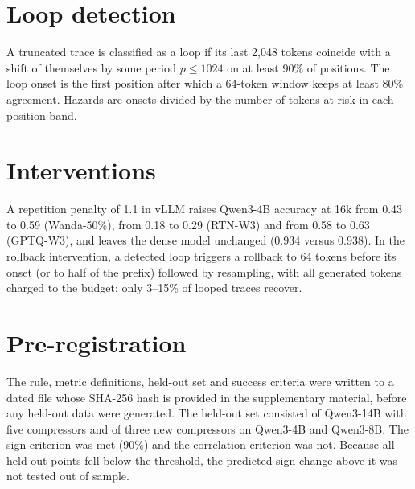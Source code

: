 \documentclass[10pt]{article}
\begin{document}
\begin{table}[t]
  \centering\small
  \caption{Accuracy at 16k tokens by sampling temperature (Qwen3-4B, MATH-500).}
  \label{tab:temp}
\end{table}

\section{Loop detection}
\label{app:loops}

A truncated trace is classified as a loop if its last 2,048 tokens coincide with a shift of themselves by some period $p\le1024$ on at least 90\% of positions. The loop onset is the first position after which a 64-token window keeps at least 80\% agreement. Hazards are onsets divided by the number of tokens at risk in each position band.

\section{Interventions}
\label{app:interventions}

A repetition penalty of 1.1 in vLLM raises Qwen3-4B accuracy at 16k from 0.43 to 0.59 (Wanda-50\%), from 0.18 to 0.29 (RTN-W3) and from 0.58 to 0.63 (GPTQ-W3), and leaves the dense model unchanged (0.934 versus 0.938). In the rollback intervention, a detected loop triggers a rollback to 64 tokens before its onset (or to half of the prefix) followed by resampling, with all generated tokens charged to the budget; only 3--15\% of looped traces recover.

\section{Pre-registration}
\label{app:prereg}

The rule, metric definitions, held-out set and success criteria were written to a dated file whose SHA-256 hash is provided in the supplementary material, before any held-out data were generated. The held-out set consisted of Qwen3-14B with five compressors and of three new compressors on Qwen3-4B and Qwen3-8B. The sign criterion was met (90\%) and the correlation criterion was not. Because all held-out points fell below the threshold, the predicted sign change above it was not tested out of sample.
\end{document}
